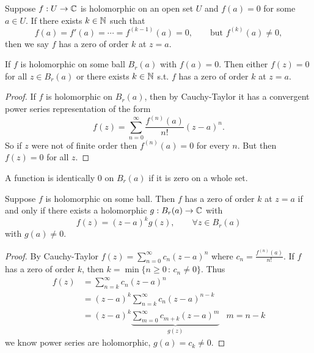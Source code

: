 \documentclass[10pt, a4paper]{article}
\begin{document}
\begin{definition}
    Suppose $f : U \to \mathbb{C}$ is holomorphic on an open set $U$ and $f(a) = 0$ for some $a \in U$.
    If there exists $k \in \mathbb{N}$ such that
    \[
    f(a) = f'(a) = \dotsi = f ^ {(k - 1)}(a) = 0,\qquad\text{but } f ^ {(k)}(a) \neq 0,
    \]
    then we say $f$ has a zero of order $k$ at $z = a$.
\end{definition}

\begin{lemma}
    If $f$ is holomorphic on some ball $B_r(a)$ with $f(a) = 0$.
    Then either $f(z) = 0$ for all $z \in B_r(a)$ or there exists $k \in \mathbb{N}$ s.t. $f$ has a zero of order $k$ at $z = a$.

    \begin{proof}
        If $f$ is holomorphic on $B_r(a)$,
        then by Cauchy-Taylor it has a convergent power series representation of the form
        \[
        f(z) = \sum_{n = 0}^{\infty}\frac{f ^ {(n)}(a)}{n!}(z - a) ^ n.
        \]
        So if $z$ were not of finite order then $f ^ {(n)}(a) = 0$ for every $n$.
        But then $f(z) = 0$ for all $z$.
    \end{proof}
\end{lemma}

A function is identically $0$ on $B_r(a)$ if it is zero on a whole set.
\begin{lemma}
    Suppose $f$ is holomorphic on some ball.
    Then $f$ has a zero of order $k$ at $z = a$ if and only if there exists a holomorphic $g : B_r(a) \to \mathbb{C}$ with
    \[
    f(z) = (z - a) ^ kg(z),\qquad \forall z \in B_r(a)
    \]
    with $g(a) \neq 0$.

    \begin{proof}
        By Cauchy-Taylor $f(z) = \sum_{n = 0}^{\infty}c_n(z - a) ^ n$ where $c_n = \frac{f ^ {(n)}(a)}{n!}$.
        If $f$ has a zero of order $k$,
        then $k = \min\{n \geq 0\,:\, c_n \neq 0\}$.
        Thus
        \begin{align*}
            f(z) &= \sum_{n = k}^{\infty}c_n(z - a) ^ n \\
            &= (z - a) ^ k\sum_{n = k}^{\infty}c_n(z - a) ^ {n - k} \\
            &= (z - a) ^ k\underbrace{\sum_{m = 0}^{\infty}c_{m + k}(z - a) ^ m}_{g(z)} & m = n - k
        \end{align*}
        we know power series are holomorphic,
        $g(a) = c_k \neq 0$.
    \end{proof}
\end{lemma}
\end{document}
